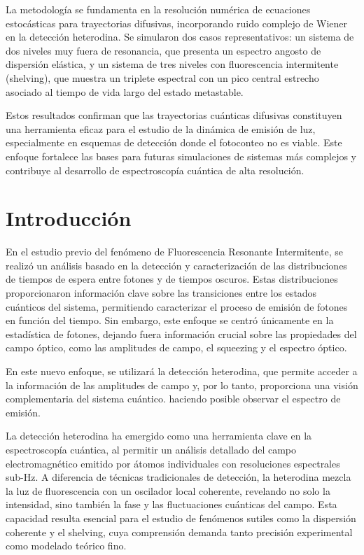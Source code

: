 \documentclass[12pt]{report}
\begin{document}
La metodología se fundamenta en la resolución numérica de ecuaciones estocásticas para trayectorias difusivas, incorporando ruido complejo de Wiener en la detección heterodina. Se simularon dos casos representativos: un sistema de dos niveles muy fuera de resonancia, que presenta un espectro angosto de dispersión elástica, y un sistema de tres niveles con fluorescencia intermitente (shelving), que muestra un triplete espectral con un pico central estrecho asociado al tiempo de vida largo del estado metastable.

Estos resultados confirman que las trayectorias cuánticas difusivas constituyen una herramienta eficaz para el estudio de la dinámica de emisión de luz, especialmente en esquemas de detección donde el fotoconteo no es viable. Este enfoque fortalece las bases para futuras simulaciones de sistemas más complejos y contribuye al desarrollo de espectroscopía cuántica de alta resolución.






\section*{Introducción}
En el estudio previo del fenómeno de Fluorescencia Resonante Intermitente, se realizó un análisis basado en la detección y caracterización de las distribuciones de tiempos de espera entre fotones y de tiempos oscuros. Estas distribuciones proporcionaron información clave sobre las transiciones entre los estados cuánticos del sistema, permitiendo caracterizar el proceso de emisión de fotones en función del tiempo.
Sin embargo, este enfoque se centró únicamente en la estadística de fotones, dejando fuera información crucial sobre las propiedades del campo óptico, como las amplitudes de campo, el squeezing y el espectro óptico.

En este nuevo enfoque, se utilizará la detección heterodina, que permite acceder a la información de las amplitudes de campo y, por lo tanto, proporciona una visión complementaria del sistema cuántico. 
haciendo posible observar el espectro de emisión.

La detección heterodina ha emergido como una herramienta clave en la espectroscopía cuántica, al permitir un análisis detallado del campo electromagnético emitido por átomos individuales con resoluciones espectrales sub-Hz. A diferencia de técnicas tradicionales de detección, la heterodina mezcla la luz de fluorescencia con un oscilador local coherente, revelando no solo la intensidad, sino también la fase y las fluctuaciones cuánticas del campo. Esta capacidad resulta esencial para el estudio de fenómenos sutiles como la dispersión coherente y el shelving, cuya comprensión demanda tanto precisión experimental como modelado teórico fino.
\end{document}
